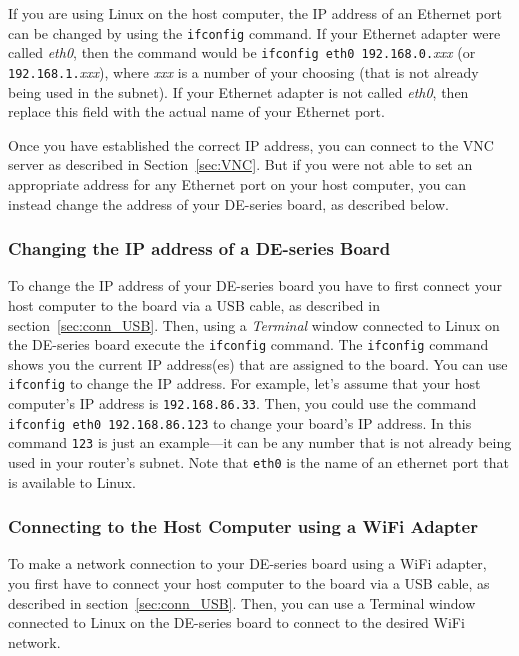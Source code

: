 \documentclass[11pt, twoside, pdftex]{article}
\begin{document}
If you are using Linux on the host computer, the IP address of an Ethernet port 
can be changed by using the
\texttt{ifconfig} command. If your Ethernet adapter were called {\it eth0}, then the command 
would be \texttt{ifconfig eth0 192.168.0.}{\it xxx} 
(or \texttt{192.168.1.}{\it xxx}), where {\it xxx} is a number
of your choosing (that is not already being used in the subnet). If your Ethernet adapter
is not called {\it eth0}, then replace this field with the actual name of your Ethernet port.

Once you have established the correct IP address, you can connect to the VNC server as
described in Section~\ref{sec:VNC}. But if you were not able to set an appropriate address
for any Ethernet port on your host computer, you can instead change the address of your DE-series 
board, as described below.

\subsubsection*{Changing the IP address of a DE-series Board}

To change the IP address of your DE-series board you have to first connect your host computer
to the board via a USB cable, as described in section~\ref{sec:conn_USB}. Then, using a 
{\it Terminal} window connected to Linux on the DE-series board execute the \texttt{ifconfig} 
command. The \texttt{ifconfig} command shows you the current IP address(es) that are
assigned to the board. You can use \texttt{ifconfig} to change the IP address. For example, 
let's assume that your host computer's IP address is \texttt{192.168.86.33}. Then, you could 
use the command \texttt{ifconfig eth0 192.168.86.123} to change your board's IP address.
In this command \texttt{123} is just an example---it can be any number that is not
already being used in your router's subnet. Note that \texttt{eth0} is the name of an ethernet
port that is available to Linux.

\subsubsection{Connecting to the Host Computer using a WiFi Adapter}
\label{sec:WiFi}

To make a network connection to your DE-series board using a WiFi adapter, you first have to 
connect your host computer to the board via a USB cable, as described in 
section~\ref{sec:conn_USB}. Then, you can use a Terminal window connected to Linux on 
the DE-series board to connect to the desired WiFi network. 
\end{document}
